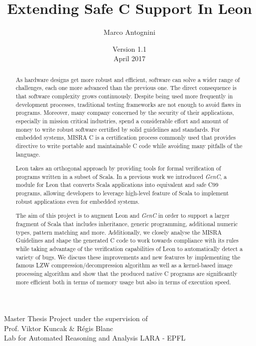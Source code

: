 \documentclass[a4paper,twoside]{article}
\title{Extending Safe C Support In Leon}
\date{
  {\small Version 1.1}\\
  April 2017
}
\author{Marco Antognini}
\newcommand{\GenC}{\emph{GenC}\xspace}
\begin{document}
\maketitle

\vfill

\begin{abstract}

As hardware designs get more robust and efficient, software can solve a wider
range of challenges, each one more advanced than the previous one. The direct
consequence is that software complexity grows continuously. Despite being used
more frequently in development processes, traditional testing frameworks are not
enough to avoid flaws in programs. Moreover, many company concerned by the
security of their applications, especially in mission critical industries, spend
a considerable effort and amount of money to write robust software certified by
solid guidelines and standards. For embedded systems, MISRA C is a certification
process commonly used that provides directive to write portable and maintainable
C code while avoiding many pitfalls of the language.

Leon takes an orthogonal approach by providing tools for formal verification of
programs written in a subset of Scala. In a previous work we introduced \GenC, a
module for Leon that converts Scala applications into equivalent and safe C99
programs, allowing developers to leverage high-level feature of Scala to
implement robust applications even for embedded systems.

The aim of this project is to augment Leon and \GenC in order to support a
larger fragment of Scala that includes inheritance, generic programming,
additional numeric types, pattern matching and more. Additionally, we closely
analyse the MISRA Guidelines and shape the generated C code to work towards
compliance with its rules while taking advantage of the verification
capabilities of Leon to automatically detect a variety of bugs. We discuss these
improvements and new features by implementing the famous LZW
compression/decompression algorithm as well as a kernel-based image processing
algorithm and show that the produced native C programs are significantly more
efficient both in terms of memory usage but also in terms of execution speed.

\end{abstract}

\vfill

\begin{center}
    Master Thesis Project under the supervision of \\
    Prof. Viktor Kuncak \& Régis Blanc \\
    Lab for Automated Reasoning and Analysis LARA - EPFL
\end{center}
\end{document}
